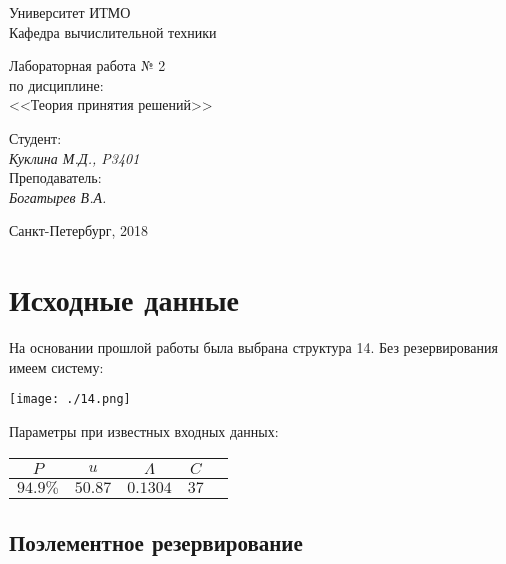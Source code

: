 \documentclass[12pt, a4paper] {ncc}
\begin{document}
\setcounter{figure}{0}
\frenchspacing
\pagestyle{empty}
\begin{center}
                            Университет ИТМО    \\
                        Кафедра вычислительной техники


\end{center}
\begin{center}
			Лабораторная работа № 2\\
		по дисциплине:\\
	<<Теория принятия решений>>
\end{center}
\begin{flushright}
                                    Студент:\\
                                    {\it Куклина М.Д., P3401}\\
                                    Преподаватель: \\
                                    {\it Богатырев В.А. }
\end{flushright}
\begin{center}
                             Санкт-Петербург, 2018
\end{center}
\newpage

\section*{Исходные данные}
На основании прошлой работы была выбрана структура 14.
Без резервирования имеем систему:


	\texttt{[image: ./14.png]}

Параметры при известных входных данных:

\begin{tabular}{|c||c|c|c|c|}
\hline
$P$       & $u$     & $\Lambda$ & $C$ \\ \hline
\hline
$94.9 \%$ & $50.87$ & $0.1304$  & $37$ \\ \hline
\end{tabular}


\subsection*{Поэлементное резервирование}
\end{document}
